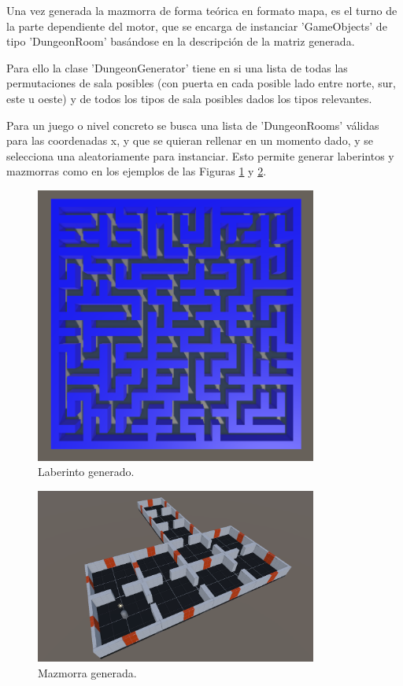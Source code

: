 Una vez generada la mazmorra de forma teórica en formato mapa, es el turno de la parte dependiente del motor, que se encarga de instanciar 'GameObjects' de tipo 'DungeonRoom' 
basándose en la descripción de la matriz generada. 

Para ello la clase 'DungeonGenerator' tiene en si una lista de todas las permutaciones de sala posibles (con puerta en cada posible lado entre norte, sur, este u oeste) 
y de todos los tipos de sala posibles dados los tipos relevantes. 

Para un juego o nivel concreto se busca una lista de 'DungeonRooms' válidas para las coordenadas x, y que se quieran rellenar en un momento dado, y se selecciona una
 aleatoriamente para instanciar. Esto permite generar laberintos y mazmorras como en los ejemplos de las Figuras \ref{fig:labyrinthExample} y \ref{fig:dungeonExample}.

\begin{figure}[H]
  \centering
    \includegraphics[width=350px,clip=true]{labyrinth_example.png}
  \caption{Laberinto generado.}
  \label{fig:labyrinthExample}
\end{figure}

\begin{figure}[H]
  \centering
    \includegraphics[width=350px,clip=true]{DungeonExample.png}
  \caption{Mazmorra generada.}
  \label{fig:dungeonExample}
\end{figure}

